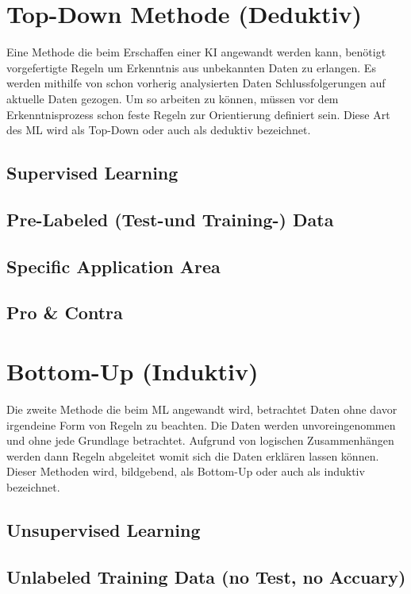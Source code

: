 \documentclass[12pt,german,ngerman]{report}
\begin{document}
    \section{Top-Down Methode (Deduktiv)}
        Eine Methode die beim Erschaffen einer KI angewandt werden kann, benötigt vorgefertigte
        Regeln um Erkenntnis aus unbekannten Daten zu erlangen. Es werden mithilfe von schon vorherig
        analysierten Daten Schlussfolgerungen auf aktuelle Daten gezogen. 
        Um so arbeiten zu können, müssen vor dem Erkenntnisprozess schon feste Regeln zur Orientierung definiert sein.
        Diese Art des ML wird als Top-Down oder auch als deduktiv\cite{dundi2021unileipzig} bezeichnet.
        \subsection{Supervised Learning}
        \subsection{Pre-Labeled (Test-und Training-) Data}
        \subsection{Specific Application Area}
        \subsection{Pro \& Contra}
        
    \section{Bottom-Up (Induktiv)}
        Die zweite Methode die beim ML angewandt wird, betrachtet Daten ohne davor irgendeine Form von Regeln zu beachten.  
        Die Daten werden unvoreingenommen und ohne jede Grundlage betrachtet.
        Aufgrund von logischen Zusammenhängen werden dann Regeln abgeleitet womit sich die Daten erklären lassen können.
        Dieser Methoden wird, bildgebend, als Bottom-Up oder auch als induktiv\cite{dundi2021unileipzig} bezeichnet.
        \subsection{Unsupervised Learning}
        \subsection{Unlabeled Training Data (no Test, no Accuary)}
\end{document}
